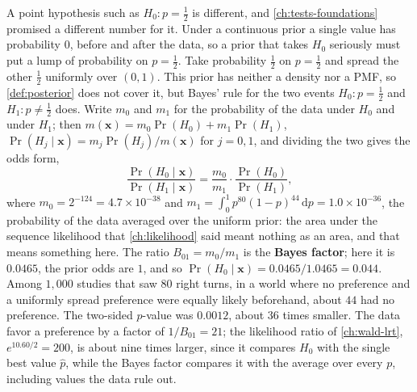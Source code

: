 A point hypothesis such as $H_0: p = \frac12$ is different, and \cref{ch:tests-foundations} promised a different number for it.
Under a continuous prior a single value has probability $0$, before and after the data, so a prior that takes $H_0$ seriously must put a lump of probability on $p = \frac12$.
Take probability $\frac12$ on $p = \frac12$ and spread the other $\frac12$ uniformly over $(0, 1)$.
This prior has neither a density nor a PMF, so \cref{def:posterior} does not cover it, but Bayes' rule for the two events $H_0: p = \frac12$ and $H_1: p \neq \frac12$ does.
Write $m_0$ and $m_1$ for the probability of the data under $H_0$ and under $H_1$; then $m(\mathbf{x}) = m_0\Pr(H_0) + m_1\Pr(H_1)$, $\Pr(H_j \mid \mathbf{x}) = m_j\Pr(H_j)/m(\mathbf{x})$ for $j = 0, 1$, and dividing the two gives the odds form,
\[
\frac{\Pr(H_0 \mid \mathbf{x})}{\Pr(H_1 \mid \mathbf{x})} = \frac{m_0}{m_1} \cdot \frac{\Pr(H_0)}{\Pr(H_1)},
\]
where $m_0 = 2^{-124} = 4.7 \times 10^{-38}$ and $m_1 = \int_0^1 p^{80}(1 - p)^{44}\,\mathrm{d}p = 1.0 \times 10^{-36}$, the probability of the data averaged over the uniform prior: the area under the sequence likelihood that \cref{ch:likelihood} said meant nothing as an area, and that means something here.
The ratio $B_{01} = m_0/m_1$ is the \textbf{Bayes factor}; here it is $0.0465$, the prior odds are $1$, and so $\Pr(H_0 \mid \mathbf{x}) = 0.0465/1.0465 = 0.044$.
Among $1{,}000$ studies that saw $80$ right turns, in a world where no preference and a uniformly spread preference were equally likely beforehand, about $44$ had no preference.
The two-sided $p$-value was $0.0012$, about $36$ times smaller.
The data favor a preference by a factor of $1/B_{01} = 21$; the likelihood ratio of \cref{ch:wald-lrt}, $e^{10.60/2} = 200$, is about nine times larger, since it compares $H_0$ with the single best value $\hat{p}$, while the Bayes factor compares it with the average over every $p$, including values the data rule out.

